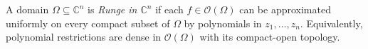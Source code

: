 
A domain $\Omega\subseteq\mathbb C^n$ is \emph{Runge in $\mathbb C^n$} if each $f\in\mathcal O(\Omega)$ can be approximated uniformly on every compact subset of $\Omega$ by polynomials in $z_1,\ldots,z_n$. Equivalently, polynomial restrictions are dense in $\mathcal O(\Omega)$ with its compact-open topology.

